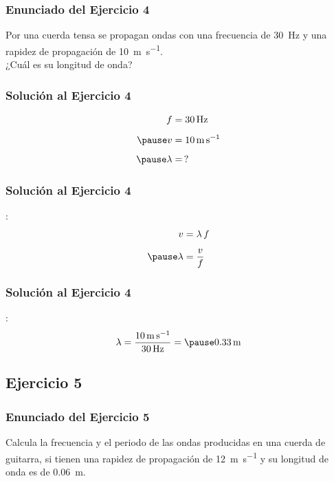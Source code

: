 \documentclass[14pt]{beamer}
\begin{document}
\begin{frame}
\frametitle{Enunciado del Ejercicio 4}
Por una cuerda tensa se propagan ondas con una frecuencia de \SI{30}{\hertz} y una rapidez de propagación de \SI{10}{\meter\per\second}. 
\\
\bigskip
\pause
¿Cuál es su longitud de onda?
\end{frame}
\begin{frame}
\frametitle{Solución al Ejercicio 4}
\pause
\begin{eqnarray*}
\begin{aligned}
f &= \SI{30}{\hertz} \\[0.5em] \pause
v &= \SI{10}{\meter\per\second} \\[0.5em] \pause
\lambda &= \, ?
\end{aligned}
\end{eqnarray*}
\end{frame}
\begin{frame}
\frametitle{Solución al Ejercicio 4}
:
\pause
\begin{eqnarray*}
\begin{aligned}
v &= \lambda \, f \\[0.5em] \pause
\lambda &= \dfrac{v}{f}
\end{aligned}
\end{eqnarray*}
\end{frame}
\begin{frame}
\frametitle{Solución al Ejercicio 4}
:
\pause
\begin{eqnarray*}
\begin{aligned}
\lambda = \dfrac{\SI{10}{\meter\per\second}}{\SI{30}{\hertz}} = \pause \SI{0.33}{\meter}
\end{aligned}
\end{eqnarray*}
\end{frame}

\subsection{Ejercicio 5}

\begin{frame}
\frametitle{Enunciado del Ejercicio 5}
Calcula la frecuencia y el periodo de las ondas producidas en una cuerda de guitarra, si tienen una rapidez de propagación de \SI{12}{\meter\per\second} y su longitud de onda es de \SI{0.06}{\meter}.
\end{frame}
\end{document}
